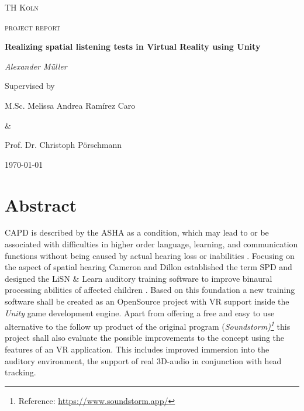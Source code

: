 \documentclass[a4paper,11pt]{article}%
\renewcommand{\\}{\vspace*{0.5\baselineskip} \newline}
\begin{document}

\begin{titlepage}
	\centering
	{\scshape\LARGE TH Köln \par}
	\vspace{1cm}
	{\scshape\Large project report\par}
	\vspace{1.5cm}
	{\huge\bfseries Realizing spatial listening tests in Virtual Reality using Unity\par}
	\vspace{2cm}
	{\Large\itshape Alexander Müller \par}
	\vfill
	Supervised by\par
	M.Sc. Melissa Andrea Ramírez Caro \par \&  \par Prof. Dr. Christoph Pörschmann
	\vfill

	{\large \today\par}
\end{titlepage}


\newpage

\tableofcontents
\newpage



\section*{Abstract}
\ac{CAPD} is described by the \ac{ASHA} as a condition, which \dq may lead to or be associated with difficulties in higher order language, learning, and communication functions\dq{} without being caused by actual hearing loss or inabilities \cite{ASHA}. Focusing on the aspect of spatial hearing Cameron and Dillon established the term \ac{SPD} and designed the \ac{LiSN} $\&$ Learn auditory training software to improve binaural processing abilities of affected children \cite{LiSN-A}.
\newline
\newline
Based on this foundation a new training software shall be created as an OpenSource project with \ac{VR} support inside the \textit{Unity} game development engine. Apart from offering a free and easy to use alternative to the follow up product of the original program (\textit{Soundstorm)\footnote{Reference: \url{https://www.soundstorm.app/}}} this project shall also evaluate the possible improvements to the concept using the features of an \ac{VR} application. This includes improved immersion into the auditory environment, the support of real 3D-audio in conjunction with head tracking.
\end{document}
